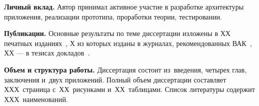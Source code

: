 \textbf{Личный вклад.} Автор принимал активное участие в разработке архитектуры приложения, реализации прототипа, проработки теории, тестировании.

\textbf{Публикации.} Основные результаты по теме диссертации изложены в ХХ печатных изданиях~\cite{Sychev,Sokolov,Gaidaenko,Lermontov,Management},
Х из которых изданы в журналах, рекомендованных ВАК~\cite{Sychev,Sokolov,Gaidaenko}, 
ХХ --- в тезисах докладов~\cite{Lermontov,Management}.

\textbf{Объем и структура работы.} Диссертация состоит из~введения, четырех глав, заключения и~двух приложений. Полный объем диссертации составляет ХХХ~страница с~ХХ~рисунками и~ХХ~таблицами. Список литературы содержит ХХХ~наименований.


\clearpage